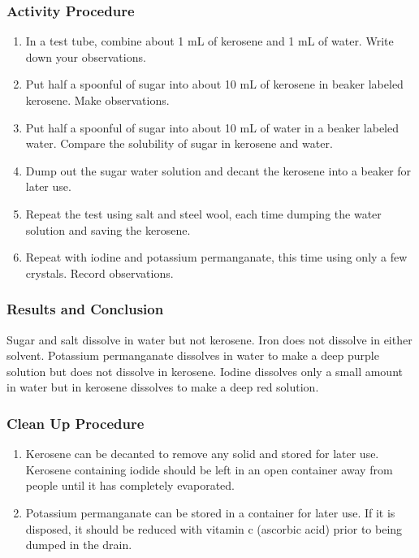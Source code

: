 \subsubsection*{Activity Procedure}
\begin{enumerate}
\item{In a test tube, combine about 1 mL of kerosene and 1 mL of water. Write down your observations.}
\item{Put half a spoonful of sugar into about 10 mL of kerosene in beaker labeled kerosene. Make observations.}
\item{Put half a spoonful of sugar into about 10 mL of water in a beaker labeled water. Compare the solubility of sugar in kerosene and water.}
\item{Dump out the sugar water solution and decant the kerosene into a beaker for later use.}
\item{Repeat the test using salt and steel wool, each time dumping the water solution and saving the kerosene.}
\item{Repeat with iodine and potassium permanganate, this time using only a few crystals. Record observations.}
\end{enumerate}

\subsubsection*{Results and Conclusion}
Sugar and salt dissolve in water but not kerosene. Iron does not dissolve in either solvent. Potassium permanganate dissolves in water to make a deep purple solution but does not dissolve in kerosene. Iodine dissolves only a small amount in water but in kerosene dissolves to make a deep red solution.

\subsubsection*{Clean Up Procedure}
\begin{enumerate}
\item{Kerosene can be decanted to remove any solid and stored for later use. Kerosene containing iodide should be left in an open container away from people until it has completely evaporated.}
\item{Potassium permanganate can be stored in a container for later use. If it is disposed, it should be reduced with vitamin c (ascorbic acid) prior to being dumped in the drain.}
\end{enumerate}

